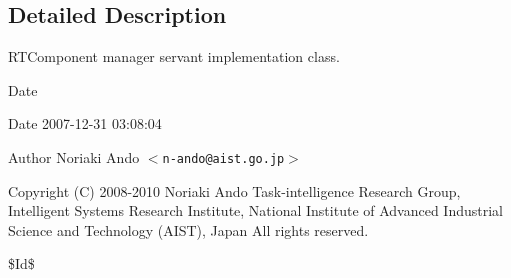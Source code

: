 \subsection{Detailed Description}
RTComponent manager servant implementation class. \begin{DoxyDate}{Date}

\end{DoxyDate}
\begin{DoxyParagraph}{Date}
2007-\/12-\/31 03:08:04 
\end{DoxyParagraph}
\begin{DoxyAuthor}{Author}
Noriaki Ando $<${\tt n-\/ando@aist.go.jp}$>$
\end{DoxyAuthor}
Copyright (C) 2008-\/2010 Noriaki Ando Task-\/intelligence Research Group, Intelligent Systems Research Institute, National Institute of Advanced Industrial Science and Technology (AIST), Japan All rights reserved.

\$Id\$ 